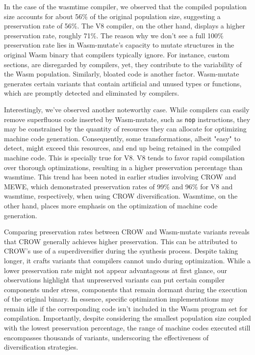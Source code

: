 \documentclass[sigplan,screen]{acmart}
\newcommand{\tool}{Wasm-mutate\xspace}
\newcommand{\wasm}{Wasm\xspace}
\begin{document}
In the case of the wasmtime compiler, we observed that the compiled population size accounts for about 56\% of the original population size, suggesting a preservation rate of 56\%. 
The V8 compiler, on the other hand, displays a higher preservation rate, roughly 71\%.
The reason why we don't see a full 100\% preservation rate lies in \tool's capacity to mutate structures in the original \wasm binary that compilers typically ignore. 
For instance, custom sections, are disregarded by compilers, yet, they contribute to the variability of the \wasm population.
Similarly, bloated code is another factor. 
\tool generates certain variants that contain artificial and unused types or functions, which are promptly detected and eliminated by compilers.

Interestingly, we've observed another noteworthy case.
While compilers can easily remove superfluous code inserted by \tool, such as \texttt{nop} instructions, they may be constrained by the quantity of resources they can allocate for optimizing machine code generation. 
Consequently, some transformations, albeit "easy" to detect, might exceed this resources, and end up being retained in the compiled machine code.
This is specially true for V8.
V8 tends to favor rapid compilation over thorough optimizations, resulting in a higher preservation percentage than wasmtime. 
This trend has been noted in earlier studies involving CROW and MEWE, which demonstrated preservation rates of 99\% and 96\% for V8 and wasmtime, respectively, when using CROW diversification. 
Wasmtime, on the other hand, places more emphasis on the optimization of machine code generation.




Comparing preservation rates between CROW and \tool variants reveals that CROW generally achieves higher preservation. 
This can be attributed to CROW's use of a superdiversifier during the synthesis process. 
Despite taking longer, it crafts variants that compilers cannot undo during optimization. 
While a lower preservation rate might not appear advantageous at first glance, our observations highlight that unpreserved variants can put certain compiler components under stress, components that remain dormant during the execution of the original binary. 
In essence, specific optimization implementations may remain idle if the corresponding code isn't included in the \wasm program set for compilation. 
Importantly, despite considering the smallest population size coupled with the lowest preservation percentage, the range of machine codes executed still encompasses thousands of variants, underscoring the effectiveness of diversification strategies.
\end{document}
